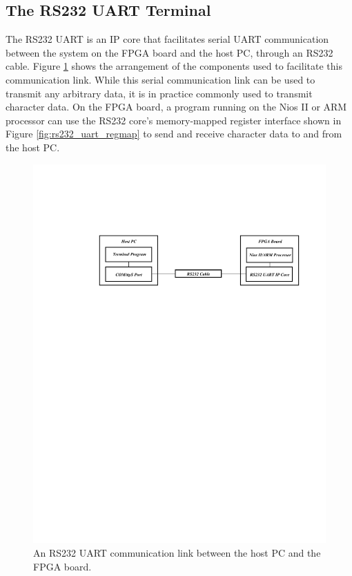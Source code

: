 \documentclass[11pt, twoside, pdftex]{article}
\begin{document}

\subsection{The RS232 UART Terminal}

The RS232 UART is an IP core that facilitates serial UART communication between the system on the FPGA board and the host PC, through an RS232 cable. Figure \ref{fig:rs232_uart_communication_link} shows the arrangement of the components used to facilitate this communication link.  While this serial communication link can be used to transmit any arbitrary data, it is in practice commonly used to transmit character data. On the FPGA board, a program running on the Nios II or ARM processor can use the RS232 core's memory-mapped register interface shown in Figure \ref{fig:rs232_uart_regmap} to send and receive character data to and from the host PC.

\begin{figure}[h!]
   \begin{center}
       \includegraphics[scale=1.0]{figures/fig_rs232_uart_communication_link.pdf}
   \end{center}
   \caption{An RS232 UART communication link between the host PC and the FPGA board.}
	\label{fig:rs232_uart_communication_link}
\end{figure}
\end{document}
